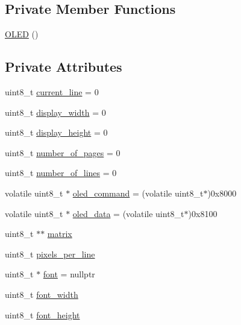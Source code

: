\subsection*{Private Member Functions}
\begin{DoxyCompactItemize}
\item 
\hyperlink{class_o_l_e_d_a8eabf371b5642d99800adb759dab27fd}{O\-L\-E\-D} ()
\end{DoxyCompactItemize}
\subsection*{Private Attributes}
\begin{DoxyCompactItemize}
\item 
uint8\-\_\-t \hyperlink{class_o_l_e_d_aebd62601be5e2ceef6295721f17fc013}{current\-\_\-line} = 0
\item 
uint8\-\_\-t \hyperlink{class_o_l_e_d_a2e9305cb3341509bb62d61f33cae76fd}{display\-\_\-width} = 0
\item 
uint8\-\_\-t \hyperlink{class_o_l_e_d_add08b51dec0ffeebcba7902c3bd4aeea}{display\-\_\-height} = 0
\item 
uint8\-\_\-t \hyperlink{class_o_l_e_d_aaac99b0eb4e9dfe92b8571488dc89288}{number\-\_\-of\-\_\-pages} = 0
\item 
uint8\-\_\-t \hyperlink{class_o_l_e_d_a9ea1c55112deede1a61142af276a6bc9}{number\-\_\-of\-\_\-lines} = 0
\item 
volatile uint8\-\_\-t $\ast$ \hyperlink{class_o_l_e_d_af0a85ccd0274347b8c1ac77d298a14cf}{oled\-\_\-command} = (volatile uint8\-\_\-t$\ast$)0x8000
\item 
volatile uint8\-\_\-t $\ast$ \hyperlink{class_o_l_e_d_a1bc54d49808f92ddfc354511b692df6f}{oled\-\_\-data} = (volatile uint8\-\_\-t$\ast$)0x8100
\item 
uint8\-\_\-t $\ast$$\ast$ \hyperlink{class_o_l_e_d_a9d32e21189940afba24deab0a2bc0126}{matrix}
\item 
uint8\-\_\-t \hyperlink{class_o_l_e_d_a6ddac7b826eccac8c682c5246ef52b29}{pixels\-\_\-per\-\_\-line}
\item 
uint8\-\_\-t $\ast$ \hyperlink{class_o_l_e_d_a29ab86a4a73f4d343bf1810927f0911d}{font} = nullptr
\item 
uint8\-\_\-t \hyperlink{class_o_l_e_d_a3c9ea103adf6c860a2534135e9a25ba8}{font\-\_\-width}
\item 
uint8\-\_\-t \hyperlink{class_o_l_e_d_a85b91421932866dea031921799ba83a3}{font\-\_\-height}
\end{DoxyCompactItemize}
